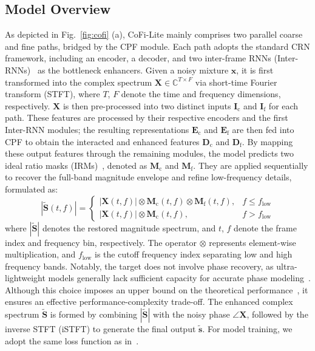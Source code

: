 \documentclass[journal]{IEEEtran}
\begin{document}
\subsection{Model Overview}
As depicted in Fig.~\ref{fig:cofi} (a), CoFi-Lite mainly comprises two parallel coarse and fine paths, bridged by the CPF module.
Each path adopts the standard CRN framework, including an encoder, a decoder, and two inter-frame RNNs (Inter-RNNs)~\cite{dpcrn} as the bottleneck enhancers.
Given a noisy mixture $\mathbf{x}$, it is first transformed into the complex spectrum $\mathbf{X} \in \mathbb{C}^{T \times F}$ via short-time Fourier transform (STFT), where $T$, $F$ denote the time and frequency dimensions, respectively. 
$\mathbf{X}$ is then pre-processed into two distinct inputs $\mathbf{I}_{\text{c}}$ and $\mathbf{I}_{\text{f}}$ for each path. 
These features are processed by their respective encoders and the first Inter-RNN modules; the resulting representations $\mathbf{E}_{\text{c}}$ and $\mathbf{E}_{\text{f}}$ are then fed into CPF to obtain the interacted and enhanced features $\mathbf{D}_{\text{c}}$ and $\mathbf{D}_{\text{f}}$.
By mapping these output features through the remaining modules, the model predicts two ideal ratio masks (IRMs)~\cite{irm}, denoted as $\mathbf{M}_{\text{c}}$ and $\mathbf{M}_{\text{f}}$.
They are applied sequentially to recover the full-band magnitude envelope and refine low-frequency details, formulated as:
\begin{equation}
|\tilde{\mathbf{S}}(t, f)| \!=\!
\begin{cases}
|\mathbf{X}(t, f)|\otimes \mathbf{M}_{\text{c}}(t, f)\otimes \mathbf{M}_{\text{f}}(t, f), & f \!\le\! f_{\text{low}} \\
|\mathbf{X}(t, f)|\otimes \mathbf{M}_{\text{c}}(t, f), & f \!>\! f_{\text{low}}
\end{cases}
\label{eq:mag_masking}
\end{equation}
\noindent where $|\tilde{\mathbf{S}}|$ denotes the restored magnitude spectrum, and $t$, $f$ denote the frame index and frequency bin, respectively. 
The operator $\otimes$ represents element-wise multiplication, and $f_\text{low}$ is the cutoff frequency index separating low and high frequency bands. 
Notably, the target does not involve phase recovery, as ultra-lightweight models generally lack sufficient capacity for accurate phase modeling~\cite{ulunas}.
Although this choice imposes an upper bound on the theoretical performance~\cite{phase}, it ensures an effective performance-complexity trade-off.
The enhanced complex spectrum $\tilde{\mathbf{S}}$ is formed by combining $|\tilde{\mathbf{S}}|$ with the noisy phase $\angle \mathbf{X}$, followed by the inverse STFT (iSTFT) to generate the final output $\tilde{\mathbf{s}}$.
For model training, we adopt the same loss function as in~\cite{gtcrn}.
\end{document}
